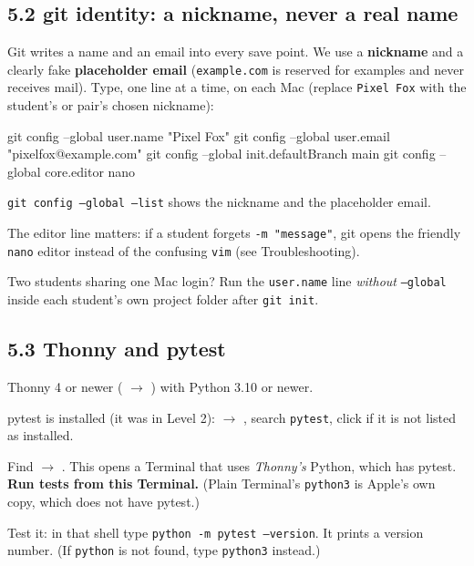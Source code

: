 \documentclass[level=3,teacher]{kidscode}
\begin{document}
\subsection{5.2 git identity: a nickname, never a real name}
Git writes a name and an email into every save point. We use a \textbf{nickname} and a clearly
fake \textbf{placeholder email} (\texttt{example.com} is reserved for examples and never receives
mail). Type, one line at a time, on each Mac (replace \texttt{Pixel Fox} with the student's or
pair's chosen nickname):
\begin{shellcode}
git config --global user.name "Pixel Fox"
git config --global user.email "pixelfox@example.com"
git config --global init.defaultBranch main
git config --global core.editor nano
\end{shellcode}
\begin{checklist}
  \item \texttt{git config --global --list} shows the nickname and the placeholder email.
  \item The editor line matters: if a student forgets \texttt{-m "message"}, git opens the
        friendly \texttt{nano} editor instead of the confusing \texttt{vim} (see Troubleshooting).
  \item Two students sharing one Mac login? Run the \texttt{user.name} line \emph{without}
        \texttt{--global} inside each student's own project folder after \texttt{git init}.
\end{checklist}

\subsection{5.3 Thonny and pytest}
\begin{checklist}
  \item Thonny 4 or newer ( $\rightarrow$ ) with Python 3.10 or newer.
  \item pytest is installed (it was in Level 2):  $\rightarrow$ ,
        search \texttt{pytest}, click  if it is not listed as installed.
  \item Find  $\rightarrow$ . This opens a Terminal that
        uses \emph{Thonny's} Python, which has pytest. \textbf{Run tests from this Terminal.}
        (Plain Terminal's \texttt{python3} is Apple's own copy, which does not have pytest.)
  \item Test it: in that shell type \texttt{python -m pytest --version}. It prints a version number.
        (If \texttt{python} is not found, type \texttt{python3} instead.)
\end{checklist}
\end{document}
